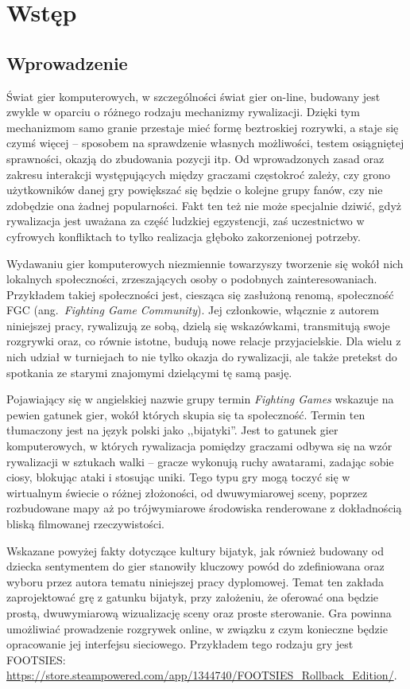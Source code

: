\chapter{Wstęp}
\section{Wprowadzenie}
Świat gier komputerowych, w szczególności świat gier on-line, budowany jest zwykle w oparciu o różnego rodzaju mechanizmy rywalizacji. Dzięki tym mechanizmom samo granie przestaje mieć formę beztroskiej rozrywki, a staje się czymś więcej -- sposobem na sprawdzenie własnych możliwości, testem osiągniętej sprawności, okazją do zbudowania pozycji itp. Od wprowadzonych zasad oraz zakresu interakcji występujących między graczami częstokroć zależy, czy grono użytkowników danej gry powiększać się będzie o kolejne grupy fanów, czy nie zdobędzie ona żadnej popularności. Fakt ten też nie może specjalnie dziwić, gdyż rywalizacja jest uważana za część ludzkiej egzystencji, zaś uczestnictwo w cyfrowych konfliktach to tylko realizacja głęboko zakorzenionej potrzeby.

Wydawaniu gier komputerowych niezmiennie towarzyszy tworzenie się wokół nich lokalnych społeczności, zrzeszających osoby o podobnych zainteresowaniach. Przykładem takiej społeczności jest, ciesząca się zasłużoną renomą, społeczność FGC (ang.~\emph{Fighting Game Community}). Jej członkowie, włącznie z autorem niniejszej pracy, rywalizują ze sobą, dzielą się wskazówkami, transmitują swoje rozgrywki oraz, co równie istotne, budują nowe relacje przyjacielskie. Dla wielu z nich udział w turniejach to nie tylko okazja do rywalizacji, ale także pretekst do spotkania ze starymi znajomymi dzielącymi tę samą pasję.

Pojawiający się w angielskiej nazwie grupy termin \emph{Fighting Games} wskazuje na pewien gatunek gier, wokół których skupia się ta społeczność. Termin ten tłumaczony jest na język polski jako ,,bijatyki''. Jest to gatunek gier komputerowych, w których rywalizacja pomiędzy graczami odbywa się na wzór rywalizacji w sztukach walki -- gracze wykonują ruchy awatarami, zadając sobie ciosy, blokując ataki i stosując uniki. Tego typu gry mogą toczyć się w wirtualnym świecie o różnej złożoności, od dwuwymiarowej sceny, poprzez rozbudowane mapy aż po trójwymiarowe środowiska renderowane z dokładnością bliską filmowanej rzeczywistości.

Wskazane powyżej fakty dotyczące kultury bijatyk, jak również budowany od dziecka sentymentem do gier stanowiły kluczowy powód do zdefiniowana oraz wyboru przez autora tematu niniejszej pracy dyplomowej. Temat ten zakłada zaprojektować grę z gatunku bijatyk, przy założeniu, że oferować ona będzie prostą, dwuwymiarową wizualizację sceny oraz proste sterowanie. Gra powinna umożliwiać prowadzenie rozgrywek online, w związku z czym konieczne będzie opracowanie jej interfejsu sieciowego. Przykładem tego rodzaju gry jest FOOTSIES: \url{https://store.steampowered.com/app/1344740/FOOTSIES_Rollback_Edition/}. 

